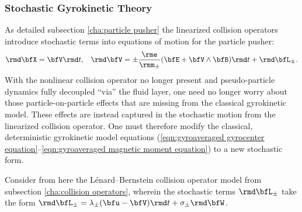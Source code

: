 \subsubsection*{Stochastic Gyrokinetic Theory}
    As detailed subsection \ref{cha:particle pusher} the linearized collision operators introduce stochastic terms into equations of motion for the particle pusher:
    \begin{align}
        \rmd\bfX  =  \bfV\rmd t,  &&
        \rmd\bfV  =  \pm\frac{\rme}{\rmm_{\pm}}(\bfE + \bfV\wedge\bfB)\rmd t + \rmd\bfL_{\pm}.
    \end{align}
    With the nonlinear collision operator no longer present and pseudo-particle dynamics fully decoupled ``via'' the fluid layer, one need no longer worry about those particle-on-particle effects that are missing from the classical gyrokinetic model. These effects are instead captured in the stochastic motion from the linearized collision operator. One must therefore modify the classical, deterministic gyrokinetic model equations (\ref{eqn:gyroaveraged gyrocenter equation}--\ref{eqn:gyroaveraged magnetic moment equation}) to a new stochastic form.

    Consider from here the Lénard--Bernstein collision operator model from subsection \ref{cha:collision operators}, wherein the stochastic terms $\rmd\bfL_{\pm}$ take the form $\rmd\bfL_{\pm}  =  \lambda_{\pm}(\bfu - \bfV)\rmd t + \sigma_{\pm}\rmd\bfW$.
    
